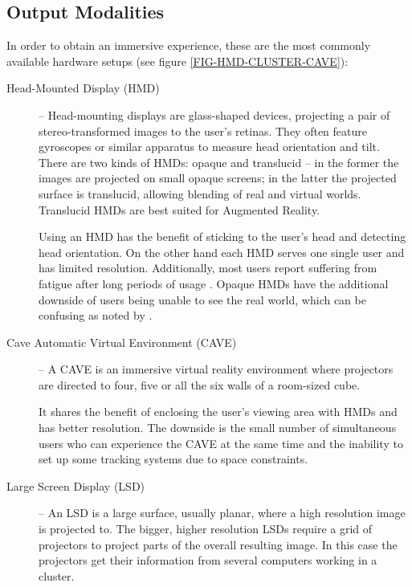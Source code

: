 \subsection{Output Modalities}


In order to obtain an immersive experience, these are the most commonly available hardware setups (see figure \ref{FIG-HMD-CLUSTER-CAVE}):

\begin{description}
	\item[Head-Mounted Display (HMD)] --
	  Head-mounting displays are glass-shaped devices, projecting a pair of stereo-transformed images
	  to the user's retinas.
	  They often feature gyroscopes or similar apparatus to measure head orientation and tilt.
	  There are two kinds of HMDs: opaque and translucid --
	  in the former the images are projected on small opaque screens;
	  in the latter the projected surface is translucid, allowing blending of real and virtual worlds.
	  Translucid HMDs are best suited for Augmented Reality.
	  
		Using an HMD has the benefit of sticking to the user's head and detecting head orientation.
		On the other hand each HMD serves one single user and has limited resolution.
		Additionally, most users report suffering from fatigue after long periods of
		usage \cite{VREDUC}.
		Opaque HMDs have the additional downside of users being unable to see the real world, 
		which can be confusing as noted by \cite{VANDERPOL}.
			
	\item[Cave Automatic Virtual Environment (CAVE)] --
	  A CAVE is an immersive virtual reality environment where projectors are directed to four,
	  five or all the six walls of a room-sized cube.
	  
		It shares the benefit of enclosing the user's viewing area with HMDs and has better resolution.
		The downside is the small number of simultaneous users who can experience the CAVE at the same time
		and the inability to set up some tracking systems due to space constraints.
	
	\item[Large Screen Display (LSD)] --
	  An LSD is a large surface, usually planar, where a high resolution image is projected to.
	  The bigger, higher resolution LSDs require a grid of projectors to project parts of the overall resulting image.
	  In this case the projectors get their information from several computers working in a cluster.
	  

\end{description}
